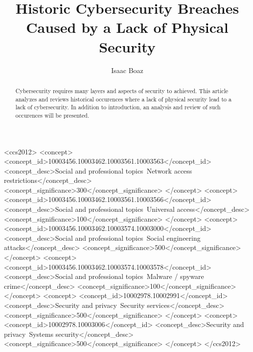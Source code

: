 \documentclass[acmsmall]{acmart}
\begin{document}
\title{Historic Cybersecurity Breaches Caused by a Lack of Physical Security}

\author{Isaac Boaz}

\renewcommand{\shortauthors}{Boaz}

\begin{abstract}
  Cybersecurity requires many layers and aspects of security to achieved.
  This article analyzes and reviews historical occurences where a lack of
  physical security lead to a lack of cybersecurity. In addition to introduction,
  an analysis and review of such occurences will be presented.
\end{abstract}


\begin{CCSXML}
  <ccs2012>
  <concept>
  <concept_id>10003456.10003462.10003561.10003563</concept_id>
  <concept_desc>Social and professional topics~Network access restrictions</concept_desc>
  <concept_significance>300</concept_significance>
  </concept>
  <concept>
  <concept_id>10003456.10003462.10003561.10003566</concept_id>
  <concept_desc>Social and professional topics~Universal access</concept_desc>
  <concept_significance>100</concept_significance>
  </concept>
  <concept>
  <concept_id>10003456.10003462.10003574.10003000</concept_id>
  <concept_desc>Social and professional topics~Social engineering attacks</concept_desc>
  <concept_significance>500</concept_significance>
  </concept>
  <concept>
  <concept_id>10003456.10003462.10003574.10003578</concept_id>
  <concept_desc>Social and professional topics~Malware / spyware crime</concept_desc>
  <concept_significance>100</concept_significance>
  </concept>
  <concept>
  <concept_id>10002978.10002991</concept_id>
  <concept_desc>Security and privacy~Security services</concept_desc>
  <concept_significance>500</concept_significance>
  </concept>
  <concept>
  <concept_id>10002978.10003006</concept_id>
  <concept_desc>Security and privacy~Systems security</concept_desc>
  <concept_significance>500</concept_significance>
  </concept>
  </ccs2012>
\end{CCSXML}

\end{document}
